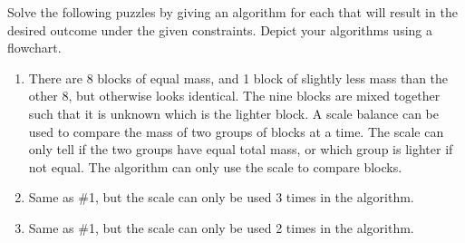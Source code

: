 Solve the following puzzles by giving an algorithm for each that will result in the desired outcome under the given constraints. Depict your algorithms using a flowchart.

\begin{enumerate}
	
	\item There are 8 blocks of equal mass, and 1 block of slightly less mass than the other 8, but otherwise looks identical. The nine blocks are mixed together such that it is unknown which is the lighter block. A scale balance can be used to compare the mass of two groups of blocks at a time. The scale can only tell if the two groups have equal total mass, or which group is lighter if not equal. The algorithm can only use the scale to compare blocks.
	
	\item Same as \#1, but the scale can only be used 3 times in the algorithm.
	
	\item Same as \#1, but the scale can only be used 2 times in the algorithm.
\end{enumerate}